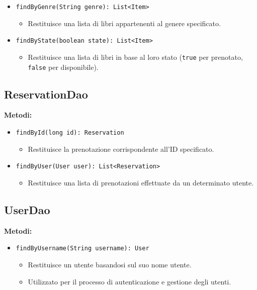 \documentclass[twoside,openright,titlepage,fleqn,headinclude,12pt,a4paper,BCOR=5mm,footinclude]{scrbook}
\begin{document}
\begin{itemize}
    \item \texttt{findByGenre(String genre): List<Item>}  
    \begin{itemize}  
        \item Restituisce una lista di libri appartenenti al genere specificato.  
    \end{itemize}  

    \item \texttt{findByState(boolean state): List<Item>}  
    \begin{itemize}  
        \item Restituisce una lista di libri in base al loro stato (\texttt{true} per prenotato, \texttt{false} per disponibile).  
    \end{itemize}  
\end{itemize}  

\subsection{ReservationDao}

\textbf{Metodi:}  
\begin{itemize}  
    \item \texttt{findById(long id): Reservation}  
    \begin{itemize}  
        \item Restituisce la prenotazione corrispondente all'ID specificato.  
    \end{itemize}  

    \item \texttt{findByUser(User user): List<Reservation>}  
    \begin{itemize}  
        \item Restituisce una lista di prenotazioni effettuate da un determinato utente.  
    \end{itemize}  

\end{itemize}  


\subsection{UserDao}

\textbf{Metodi:}  
\begin{itemize}  
    \item \texttt{findByUsername(String username): User}  
    \begin{itemize}  
        \item Restituisce un utente basandosi sul suo nome utente.  
        \item Utilizzato per il processo di autenticazione e gestione degli utenti.  
    \end{itemize}  
\end{itemize}  
\end{document}
